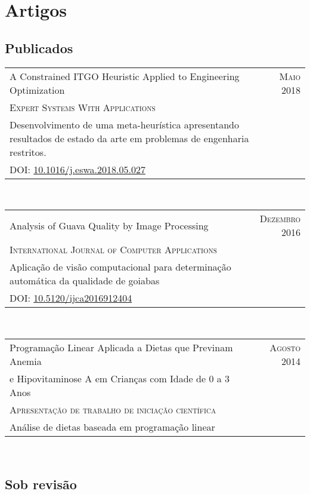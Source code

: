 \section{Artigos}

\subsection*{Publicados}

\begin{tabular}{p{11cm}|r}
  \label{C-ITGO}
  A Constrained ITGO Heuristic Applied to Engineering Optimization & \textsc{Maio 2018} \\
  \textsc{Expert Systems With Applications} & \\
  \footnotesize{Desenvolvimento de uma meta-heurística apresentando resultados de estado da arte em problemas de engenharia restritos.} & \\
  \footnotesize{DOI: \href{https://doi.org/10.1016/j.eswa.2018.05.027}{10.1016/j.eswa.2018.05.027}} & \\
\end{tabular}\\


\begin{tabular}{p{11cm}|r}
  \label{jseg}
  Analysis of Guava Quality by Image Processing & \textsc{Dezembro 2016} \\
  \textsc{International Journal of Computer Applications} & \\
  \footnotesize{Aplicação de visão computacional para determinação automática da qualidade de goiabas} & \\
  \footnotesize{DOI: \href{https://doi.org/10.5120/ijca2016912404}{10.5120/ijca2016912404}} & \\
\end{tabular}\\


\begin{tabular}{p{11cm}|r}
  Programação Linear Aplicada a Dietas que Previnam Anemia  & \textsc{Agosto 2014} \\
  e Hipovitaminose A em Crianças com Idade de 0 a 3 Anos & \\
  \textsc{Apresentação de trabalho de iniciação científica} & \\
  \footnotesize{Análise de dietas baseada em programação linear} & \\
\end{tabular}\\


\subsection*{Sob revisão}

